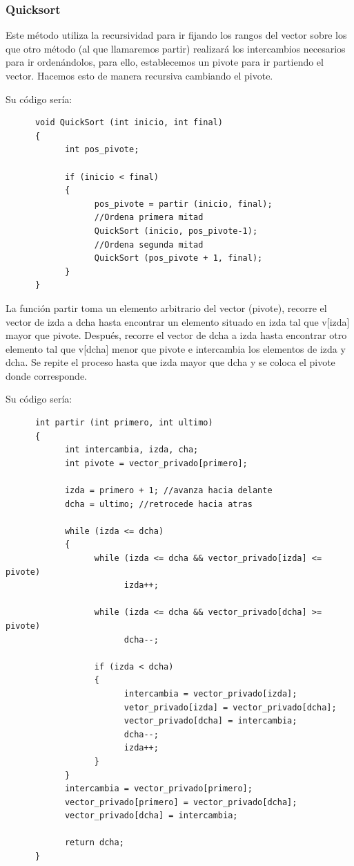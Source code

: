 \documentclass[10pt,a4paper,spanish]{report}
\begin{document}
                  \subsubsection{\textcolor[rgb]{0.5,0.8,0.1}Quicksort}
                  \noindent
                        Este método utiliza la recursividad para ir fijando los rangos del vector sobre los que otro método (al que llamaremos partir) realizará los intercambios necesarios para ir ordenándolos, para ello, establecemos un pivote para ir partiendo el vector. Hacemos esto de manera recursiva cambiando el pivote.

                        \noindent
                        Su código sería:
      \begin{verbatim}
      void QuickSort (int inicio, int final)
      {
            int pos_pivote;

            if (inicio < final)
            {
                  pos_pivote = partir (inicio, final);
                  //Ordena primera mitad
                  QuickSort (inicio, pos_pivote-1);
                  //Ordena segunda mitad
                  QuickSort (pos_pivote + 1, final);
            }
      }
      \end{verbatim}

                        \noindent
                        La función partir toma un elemento arbitrario del vector (pivote), recorre el vector de izda a dcha hasta encontrar un elemento situado en izda tal que v[izda] mayor que pivote. Después, recorre el vector de dcha a izda hasta encontrar otro elemento tal que v[dcha] menor que pivote e intercambia los elementos de izda y dcha. Se repite el proceso hasta que izda mayor que dcha y se coloca el pivote donde corresponde.

                        \noindent
                        Su código sería:
      \begin{verbatim}
      int partir (int primero, int ultimo)
      {
            int intercambia, izda, cha;
            int pivote = vector_privado[primero];

            izda = primero + 1; //avanza hacia delante
            dcha = ultimo; //retrocede hacia atras

            while (izda <= dcha)
            {
                  while (izda <= dcha && vector_privado[izda] <= pivote)
                        izda++;

                  while (izda <= dcha && vector_privado[dcha] >= pivote)
                        dcha--;

                  if (izda < dcha)
                  {
                        intercambia = vector_privado[izda];
                        vetor_privado[izda] = vector_privado[dcha];
                        vector_privado[dcha] = intercambia;
                        dcha--;
                        izda++;
                  }
            }
            intercambia = vector_privado[primero];
            vector_privado[primero] = vector_privado[dcha];
            vector_privado[dcha] = intercambia;

            return dcha;
      }
      \end{verbatim}
\end{document}
